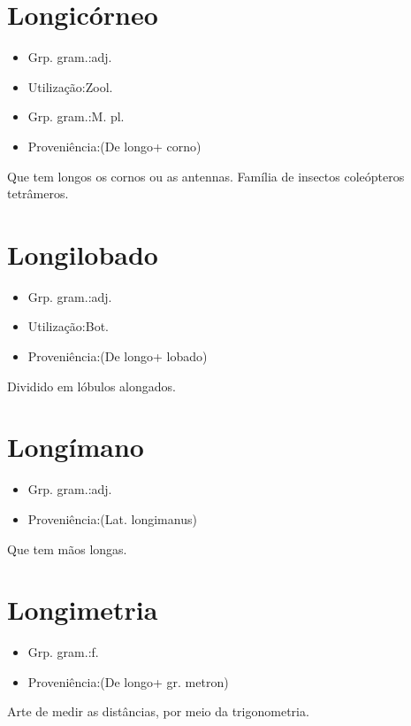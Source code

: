 \section{Longicórneo}
\begin{itemize}
\item {Grp. gram.:adj.}
\end{itemize}
\begin{itemize}
\item {Utilização:Zool.}
\end{itemize}
\begin{itemize}
\item {Grp. gram.:M. pl.}
\end{itemize}
\begin{itemize}
\item {Proveniência:(De \textunderscore longo\textunderscore  + \textunderscore corno\textunderscore )}
\end{itemize}
Que tem longos os cornos ou as antennas.
Família de insectos coleópteros tetrâmeros.
\section{Longilobado}
\begin{itemize}
\item {Grp. gram.:adj.}
\end{itemize}
\begin{itemize}
\item {Utilização:Bot.}
\end{itemize}
\begin{itemize}
\item {Proveniência:(De \textunderscore longo\textunderscore  + \textunderscore lobado\textunderscore )}
\end{itemize}
Dividido em lóbulos alongados.
\section{Longímano}
\begin{itemize}
\item {Grp. gram.:adj.}
\end{itemize}
\begin{itemize}
\item {Proveniência:(Lat. \textunderscore longimanus\textunderscore )}
\end{itemize}
Que tem mãos longas.
\section{Longimetria}
\begin{itemize}
\item {Grp. gram.:f.}
\end{itemize}
\begin{itemize}
\item {Proveniência:(De \textunderscore longo\textunderscore  + gr. \textunderscore metron\textunderscore )}
\end{itemize}
Arte de medir as distâncias, por meio da trigonometria.
